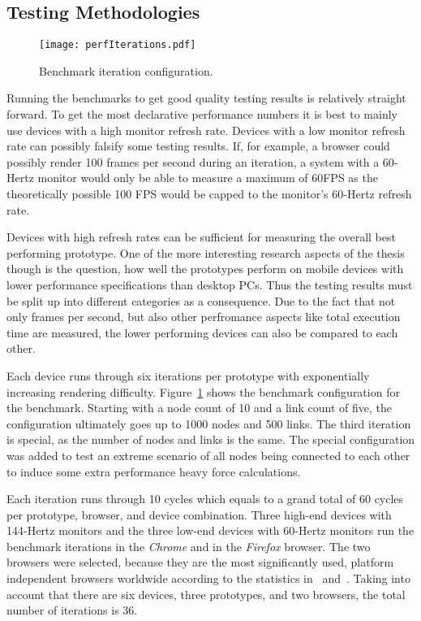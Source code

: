 \subsection{Testing Methodologies}

\begin{figure}
\centering
\texttt{[image: perfIterations.pdf]}
\caption{Benchmark iteration configuration.}
\label{fig:perfIterations}
\end{figure}

Running the benchmarks to get good quality testing results is relatively straight forward. To get the most declarative performance numbers it is best to mainly use devices with a high monitor refresh rate. Devices with a low monitor refresh rate can possibly falsify some testing results. If, for example, a browser could possibly render 100 frames per second during an iteration, a system with a 60-Hertz monitor would only be able to measure a maximum of 60FPS as the theoretically possible 100 FPS would be capped to the monitor's 60-Hertz refresh rate.

Devices with high refresh rates can be sufficient for measuring the overall best performing prototype. One of the more interesting research aspects of the thesis though is the question, how well the prototypes perform on mobile devices with lower performance specifications than desktop PCs. Thus the testing results must be split up into different categories as a consequence. Due to the fact that not only frames per second, but also other perfromance aspects like total execution time are measured, the lower performing devices can also be compared to each other.

Each device runs through six iterations per prototype with exponentially increasing rendering difficulty. Figure~\ref{fig:perfIterations} shows the benchmark configuration for the benchmark. Starting with a node count of 10 and a link count of five, the configuration ultimately goes up to 1000 nodes and 500 links. The third iteration is special, as the number of nodes and links is the same. The special configuration was added to test an extreme scenario of all nodes being connected to each other to induce some extra performance heavy force calculations.

Each iteration runs through 10 cycles which equals to a grand total of 60 cycles per prototype, browser, and device combination. Three high-end devices with 144-Hertz monitors and the three low-end devices with 60-Hertz monitors run the benchmark iterations in the \emph{Chrome} and in the \emph{Firefox} browser. The two browsers were selected, because they are the most significantly used, platform independent browsers worldwide according to the statistics in~\cite{StatCounterBrowserMarketShare} and~\cite{W3CBrowserMarketShare}. Taking into account that there are six devices, three prototypes, and two browsers, the total number of iterations is 36.

